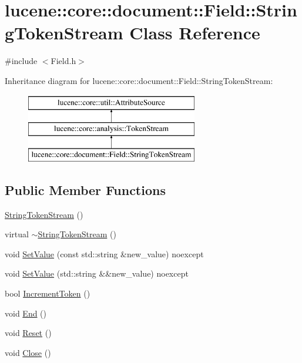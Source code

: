 \hypertarget{classlucene_1_1core_1_1document_1_1Field_1_1StringTokenStream}{}\section{lucene\+:\+:core\+:\+:document\+:\+:Field\+:\+:String\+Token\+Stream Class Reference}
\label{classlucene_1_1core_1_1document_1_1Field_1_1StringTokenStream}


{\ttfamily \#include $<$Field.\+h$>$}

Inheritance diagram for lucene\+:\+:core\+:\+:document\+:\+:Field\+:\+:String\+Token\+Stream\+:\begin{figure}[H]
\begin{center}
\leavevmode
\includegraphics[height=3.000000cm]{classlucene_1_1core_1_1document_1_1Field_1_1StringTokenStream}
\end{center}
\end{figure}
\subsection*{Public Member Functions}
\begin{DoxyCompactItemize}
\item 
\mbox{\hyperlink{classlucene_1_1core_1_1document_1_1Field_1_1StringTokenStream_afccecc9c42efd7a2f877f1603dc6fe24}{String\+Token\+Stream}} ()
\item 
virtual \mbox{\hyperlink{classlucene_1_1core_1_1document_1_1Field_1_1StringTokenStream_a6331ec9abcbb378340d8d3b529984877}{$\sim$\+String\+Token\+Stream}} ()
\item 
void \mbox{\hyperlink{classlucene_1_1core_1_1document_1_1Field_1_1StringTokenStream_a6ae21119a25849cde57ccab961acc6b6}{Set\+Value}} (const std\+::string \&new\+\_\+value) noexcept
\item 
void \mbox{\hyperlink{classlucene_1_1core_1_1document_1_1Field_1_1StringTokenStream_a1c8b8ddfdbe6ae7ceaa55f6a40598304}{Set\+Value}} (std\+::string \&\&new\+\_\+value) noexcept
\item 
bool \mbox{\hyperlink{classlucene_1_1core_1_1document_1_1Field_1_1StringTokenStream_a161893ca5de24e392426fea5999334fb}{Increment\+Token}} ()
\item 
void \mbox{\hyperlink{classlucene_1_1core_1_1document_1_1Field_1_1StringTokenStream_acbadfa77de855b030af35f1206231525}{End}} ()
\item 
void \mbox{\hyperlink{classlucene_1_1core_1_1document_1_1Field_1_1StringTokenStream_a36e021820bb6ed2984c4f34f2f41a470}{Reset}} ()
\item 
void \mbox{\hyperlink{classlucene_1_1core_1_1document_1_1Field_1_1StringTokenStream_a1852abe05943aaf330ef776fc783f472}{Close}} ()
\end{DoxyCompactItemize}
